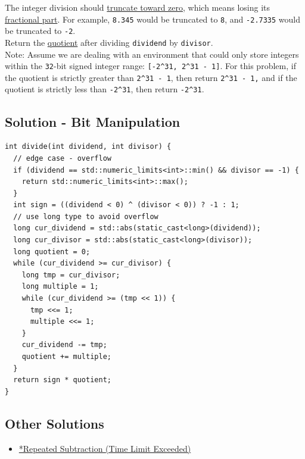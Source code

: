 The integer division should \ul{truncate toward zero}, which means losing its \ul{fractional part}. For example, {\colorbox{CodeBackground}{\lstinline|8.345|}} would be truncated to {\colorbox{CodeBackground}{\lstinline|8|}}, and {\colorbox{CodeBackground}{\lstinline|-2.7335|}} would be truncated to {\colorbox{CodeBackground}{\lstinline|-2|}}.\\

Return the \ul{quotient} after dividing {\colorbox{CodeBackground}{\lstinline|dividend|}} by {\colorbox{CodeBackground}{\lstinline|divisor|}}.\\

Note: Assume we are dealing with an environment that could only store integers within the {\colorbox{CodeBackground}{\lstinline|32|}}-bit signed integer range:  {\colorbox{CodeBackground}{\lstinline|[-2^31, 2^31 - 1]|}}.  For this problem, if the quotient is strictly greater than {\colorbox{CodeBackground}{\lstinline|2^31 - 1|}}, then return {\colorbox{CodeBackground}{\lstinline|2^31 - 1,|}} and if the quotient is strictly less than {\colorbox{CodeBackground}{\lstinline|-2^31|}}, then return {\colorbox{CodeBackground}{\lstinline|-2^31|}}.

\subsection*{Solution - Bit Manipulation}\label{solution:lc0029_bit_manipulation}
\begin{lstlisting}
int divide(int dividend, int divisor) {
  // edge case - overflow
  if (dividend == std::numeric_limits<int>::min() && divisor == -1) {
    return std::numeric_limits<int>::max();
  }
  int sign = ((dividend < 0) ^ (divisor < 0)) ? -1 : 1;
  // use long type to avoid overflow
  long cur_dividend = std::abs(static_cast<long>(dividend));
  long cur_divisor = std::abs(static_cast<long>(divisor));
  long quotient = 0;
  while (cur_dividend >= cur_divisor) {
    long tmp = cur_divisor;
    long multiple = 1;
    while (cur_dividend >= (tmp << 1)) {
      tmp <<= 1;
      multiple <<= 1;
    }
    cur_dividend -= tmp;
    quotient += multiple;
  }
  return sign * quotient;
}
\end{lstlisting}

\subsection*{Other Solutions}
\begin{itemize}
\item \hyperref[solution:lc0029_repeated_substraction]{*Repeated Subtraction (Time Limit Exceeded)}
\end{itemize}


